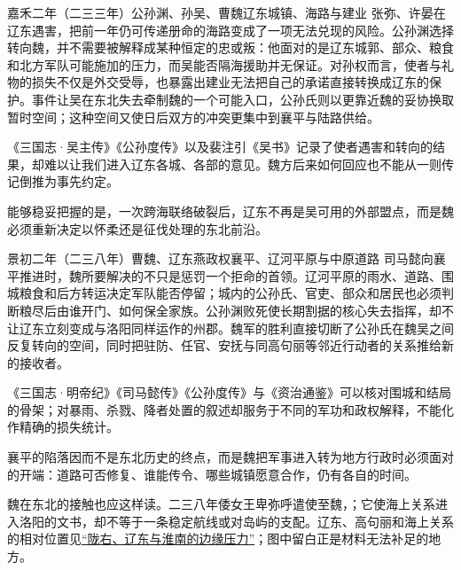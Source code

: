 \begin{event}{}{嘉禾二年（二三三年）}{公孙渊、孙吴、曹魏}{辽东城镇、海路与建业}
张弥、许晏在辽东遇害，把前一年仍可传递册命的海路变成了一项无法兑现的风险。公孙渊选择转向魏，并不需要被解释成某种恒定的忠或叛：他面对的是辽东城郭、部众、粮食和北方军队可能施加的压力，而吴能否隔海援助并无保证。对孙权而言，使者与礼物的损失不仅是外交受辱，也暴露出建业无法把自己的承诺直接转换成辽东的保护。事件让吴在东北失去牵制魏的一个可能入口，公孙氏则以更靠近魏的妥协换取暂时空间；这种空间又使日后双方的冲突更集中到襄平与陆路供给。

\begin{sourcenote}[使者遇害不能揭示辽东各城的全部意见]
《三国志·吴主传》《公孙度传》以及裴注引《吴书》记录了使者遇害和转向的结果，却难以让我们进入辽东各城、各部的意见。魏方后来如何回应也不能从一则传记倒推为事先约定。
\end{sourcenote}
能够稳妥把握的是，一次跨海联络破裂后，辽东不再是吴可用的外部盟点，而是魏必须重新决定以怀柔还是征伐处理的东北前沿。
\end{event}

\begin{event}{}{景初二年（二三八年）}{曹魏、辽东燕政权}{襄平、辽河平原与中原道路}
司马懿向襄平推进时，魏所要解决的不只是惩罚一个拒命的首领。辽河平原的雨水、道路、围城粮食和后方转运决定军队能否停留；城内的公孙氏、官吏、部众和居民也必须判断粮尽后由谁开门、如何保全家族。公孙渊败死使长期割据的核心失去指挥，却不让辽东立刻变成与洛阳同样运作的州郡。魏军的胜利直接切断了公孙氏在魏吴之间反复转向的空间，同时把驻防、任官、安抚与同高句丽等邻近行动者的关系推给新的接收者。

\begin{sourcenote}[襄平的战功叙述不能化成精确损失统计]
《三国志·明帝纪》《司马懿传》《公孙度传》与《资治通鉴》可以核对围城和结局的骨架；对暴雨、杀戮、降者处置的叙述却服务于不同的军功和政权解释，不能化作精确的损失统计。
\end{sourcenote}
襄平的陷落因而不是东北历史的终点，而是魏把军事进入转为地方行政时必须面对的开端：道路可否修复、谁能传令、哪些城镇愿意合作，仍有各自的时间。
\end{event}

魏在东北的接触也应这样读。二三八年倭女王卑弥呼遣使至魏，；它使海上关系进入洛阳的文书，却不等于一条稳定航线或对岛屿的支配。辽东、高句丽和海上关系的相对位置见\hyperref[fig:vol02b:northern-liaodong]{“陇右、辽东与淮南的边缘压力”}；图中留白正是材料无法补足的地方。

